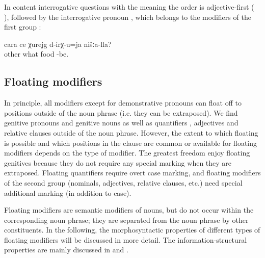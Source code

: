In content interrogative questions with the meaning  the order is adjective-first ( ), followed by the interrogative pronoun  , which belongs to the modifiers of the first group :
%
\begin{exe}
	\ex	\label{ex:What other food of ours exists@12}
	\gll	cara	ce	χurejg	d-irχ-u=ja	nišːa-lla?\\
		other	what	food	-be.	\\
	\glt	{}
\end{exe}


\subsection{Floating modifiers}
\label{ssec:Floating modifiers}
In principle, all modifiers except for demonstrative pronouns can float off to positions outside of the noun phrase (i.e. they can be extraposed). We find genitive pronouns  and genitive nouns  as well as quantifiers , adjectives  and relative clauses  outside of the noun phrase. However, the extent to which floating is possible and which positions in the clause are common or available for floating modifiers depends on the type of modifier. The greatest freedom enjoy floating genitives because they do not require any special marking when they are extraposed. Floating quantifiers require overt case marking, and floating modifiers of the second group (nominals, adjectives, relative clauses, etc.) need special additional marking (in addition to case). 

Floating modifiers are semantic modifiers of nouns, but do not occur within the corresponding noun phrase; they are separated from the noun phrase by other constituents. In the following, the morphosyntactic properties of different types of floating modifiers will be discussed in more detail. The information-structural properties are mainly discussed in  and .

